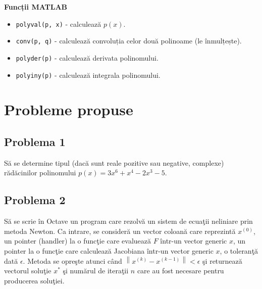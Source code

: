 \documentclass{exam}
\begin{document}
\textbf{Funcții MATLAB}
\begin{itemize}
    \item \verb|polyval(p, x)| - calculează $p(x)$.
    \item \verb|conv(p, q)| - calculează convoluția celor două polinoame (le înmulțește).
    \item \verb|polyder(p)| - calculează derivata polinomului.
    \item \verb|polyiny(p)| - calculează integrala polinomului.
\end{itemize}

\section{Probleme propuse}

\subsection{Problema 1}
Să se determine tipul (dacă sunt reale pozitive sau negative, complexe) rădăcinilor polinomului $p(x)=3x^{6}+x^{4}-2x^{3}-5$.

\subsection{Problema 2}
Să se scrie în Octave un program care rezolvă un sistem de ecuaţii neliniare prin metoda Newton. Ca intrare, se consideră un vector coloană care reprezintă $x^{(0)}$, un pointer (handler) la o funcţie care evaluează $F$ într-un vector generic $x$, un pointer la o funcţie care calculează Jacobiana într-un vector generic $x$, o toleranţă dată $\epsilon$. Metoda se opreşte atunci când  $\left \| x^{(k)}-x^{(k-1)} \right \|< \epsilon$ şi returnează vectorul soluţie $x^{*}$ şi numărul de iteraţii $n$ care au fost necesare pentru producerea soluţiei.


\end{document}
